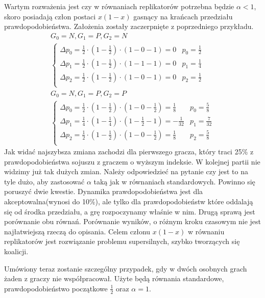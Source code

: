 Wartym rozważenia jest czy w równaniach replikatorów potrzebna będzie $\alpha < 1$, skoro posiadają człon postaci $x(1-x)$ gasnący na krańcach przedziału prawdopodobieństwa. Założenia zostały zaczerpnięte z poprzedniego przykładu.
\begin{gather*}
G_0 = N, G_1 = P, G_2 = N \\
\left\{
\begin{array}{ll}
\Delta p_0 = \frac{1}{2} \cdot (1 - \frac{1}{2}) \cdot (1 - 0 - 1) =  0 & p_0=\frac{1}{2}\\
\Delta p_1 = \frac{1}{2} \cdot (1 - \frac{1}{2}) \cdot (1 - 1 - 1) =  0 & p_1= \frac{1}{4}\\
\Delta p_2 = \frac{1}{2} \cdot (1 - \frac{1}{2}) \cdot (1 - 0 - 1) =  0 & p_2=\frac{1}{2}\\
\end{array} 
\right.
\\
G_0 = N, G_1 = P, G_2 = P \\
\left\{
\begin{array}{ll}
\Delta p_0 = \frac{1}{2} \cdot (1 - \frac{1}{2}) \cdot (1 - 0 - \frac{1}{2}) = \frac{1}{8} & p_0=\frac{5}{8}\\
\Delta p_1 = \frac{1}{4} \cdot (1 - \frac{1}{4}) \cdot (1 - \frac{1}{2} - 1) = -\frac{1}{32} & p_1= \frac{7}{32}\\
\Delta p_2 = \frac{1}{2} \cdot (1 - \frac{1}{2}) \cdot (1 - 0 - \frac{1}{2}) = \frac{1}{8}  & p_2=\frac{5}{8}\\
\end{array}
\right.
\end{gather*}
Jak widać najszybsza zmiana zachodzi dla pierwszego gracza, który traci 25\% z prawdopodobieństwa sojuszu z graczem o wyższym indeksie. W kolejnej partii nie widzimy już tak dużych zmian. Należy odpowiedzieć na pytanie czy jest to na tyle dużo, aby zastosować $\alpha$ taką jak w równaniach standardowych. Powinno się poruszyć dwie kwestie. Dynamika prawdopodobieństwa jest dla akceptowalna(wynosi do 10\%), ale tylko dla prawdopodobieństw które oddalają się od środka przedziału, a grę rozpoczynamy właśnie w nim. Drugą sprawą jest porównanie obu równań. Porównanie wyników, o różnym kroku czasowym nie jest najłatwiejszą rzeczą do opisania. Celem członu $x(1-x)$ w równaniu replikatorów jest rozwiązanie problemu supersilnych, szybko tworzących się koalicji.


Umówiony teraz zostanie szczególny przypadek, gdy w dwóch osobnych grach żaden z graczy nie współpracował. Użyte będą równania standardowe, prawdopodobieństwo początkowe $\frac{1}{2}$ oraz $\alpha = 1$.

